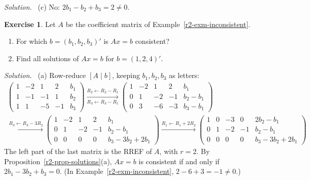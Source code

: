 \documentclass[12pt]{article}
\theoremstyle{definition}
\newtheorem{exercise}{Exercise}
\newenvironment{solution}{\par\noindent\textit{Solution.}\ }{\par\smallskip}
\begin{document}
\begin{solution}
(c) No: \(2b_1-b_2+b_3=2\ne0\).
\end{solution}

\begin{exercise}\label{r2-ex-which-b}
Let \(A\) be the coefficient matrix of Example~\ref{r2-exm-inconsistent}.
\begin{enumerate}
\item For which \(b=(b_1,b_2,b_3)'\) is \(Ax=b\) consistent?
\item Find all solutions of \(Ax=b\) for \(b=(1,2,4)'\).
\end{enumerate}
\end{exercise}
\begin{solution}
(a) Row-reduce \([A\mid b]\), keeping \(b_1,b_2,b_3\) as letters:
\[
\begin{gathered}
\left(\begin{array}{cccc|c}1&-2&1&2&b_1\\1&-1&-1&1&b_2\\1&1&-5&-1&b_3\end{array}\right)
\xrightarrow[R_3\leftarrow R_3-R_1]{R_2\leftarrow R_2-R_1}
\left(\begin{array}{cccc|c}1&-2&1&2&b_1\\0&1&-2&-1&b_2-b_1\\0&3&-6&-3&b_3-b_1\end{array}\right)
\\
\xrightarrow{R_3\leftarrow R_3-3R_2}
\left(\begin{array}{cccc|c}1&-2&1&2&b_1\\0&1&-2&-1&b_2-b_1\\0&0&0&0&b_3-3b_2+2b_1\end{array}\right)
\xrightarrow{R_1\leftarrow R_1+2R_2}
\left(\begin{array}{cccc|c}1&0&-3&0&2b_2-b_1\\0&1&-2&-1&b_2-b_1\\0&0&0&0&b_3-3b_2+2b_1\end{array}\right)
\end{gathered}
\]
The left part of the last matrix is the RREF of \(A\), with \(r=2\). By
Proposition~\ref{r2-prop-solutions}(a), \(Ax=b\) is consistent if and only if
\(2b_1-3b_2+b_3=0\). (In Example~\ref{r2-exm-inconsistent}, \(2-6+3=-1\ne0\).)


\end{solution}
\end{document}
